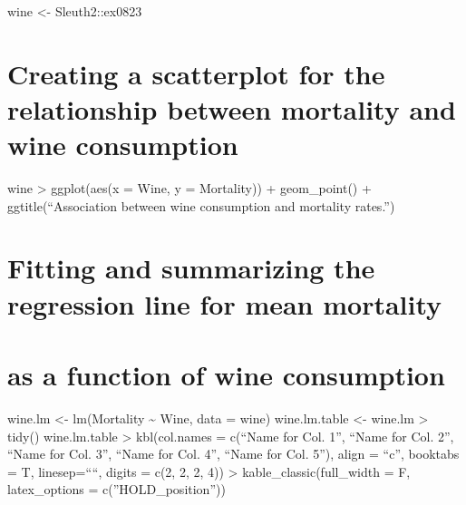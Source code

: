 \documentclass[
  letterpaper,
  DIV=11,
  numbers=noendperiod]{scrartcl}
\begin{document}
wine \textless- Sleuth2::ex0823

\hypertarget{creating-a-scatterplot-for-the-relationship-between-mortality-and-wine-consumption}{%
\section{Creating a scatterplot for the relationship between mortality
and wine
consumption}\label{creating-a-scatterplot-for-the-relationship-between-mortality-and-wine-consumption}}

wine \textbar\textgreater{} ggplot(aes(x = Wine, y = Mortality)) +
geom\_point() + ggtitle(``Association between wine consumption and
mortality rates.'')

\hypertarget{fitting-and-summarizing-the-regression-line-for-mean-mortality}{%
\section{Fitting and summarizing the regression line for mean
mortality}\label{fitting-and-summarizing-the-regression-line-for-mean-mortality}}

\hypertarget{as-a-function-of-wine-consumption}{%
\section{as a function of wine
consumption}\label{as-a-function-of-wine-consumption}}

wine.lm \textless- lm(Mortality \textasciitilde{} Wine, data = wine)
wine.lm.table \textless- wine.lm \textbar\textgreater{} tidy()
wine.lm.table \textbar\textgreater{} kbl(col.names = c(``Name for Col.
1'', ``Name for Col. 2'', ``Name for Col. 3'', ``Name for Col. 4'',
``Name for Col. 5''), align = ``c'', booktabs = T, linesep=````, digits
= c(2, 2, 2, 4)) \textbar\textgreater{} kable\_classic(full\_width = F,
latex\_options = c(''HOLD\_position''))
\end{document}
